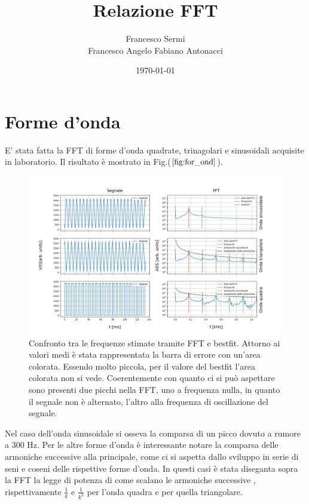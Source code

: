 \documentclass{article}
\author{Francesco Sermi\\Francesco Angelo Fabiano Antonacci}
\date{\today}
\title{Relazione FFT}
\begin{document}
\maketitle

\section{Forme d'onda}
    \label{sez:for_ond}
    
    E' stata fatta la FFT di forme d'onda quadrate, trinagolari e sinusoidali
    acquisite in laboratorio.
    Il risultato è mostrato in Fig.($\ref{fig:for_ond}$).

        \begin{figure}[H]
            \centering
            \includegraphics[scale=0.45]{FFT5/FFTwaveforms1.png}
            \caption{Confronto tra le frequenze stimate tramite FFT e bestfit.
                    Attorno ai valori medi è stata rappresentata la barra di errore 
                    con un'area colorata. Essendo molto piccola, per il valore del bestfit
                    l'area colorata non si vede.
                    Coerentemente con quanto ci si può aspettare sono presenti due picchi nella FFT,
                    uno a frequenza nulla, in quanto il segnale non è alternato, l'altro
                    alla frequenza di oscillazione del segnale.}
            \label{fig:for_ond}
        \end{figure}    

    Nel caso dell'onda sinusoidale si osseva la comparsa di un picco dovuto a 
    rumore a $300$ Hz.
    Per le altre forme d'onda è interessante notare la comparsa delle 
    armoniche successive alla principale, come ci si aspetta dallo 
    sviluppo in serie di seni e coseni delle rispettive forme d'onda.
    In questi casi è stata diseganta sopra la FFT
    la legge di potenza di come scalano le armoniche successive , rispettivamente
    $\frac{1}{k}$ e $\frac{1}{k^2}$ per l'onda quadra e  per quella triangolare.
\end{document}

